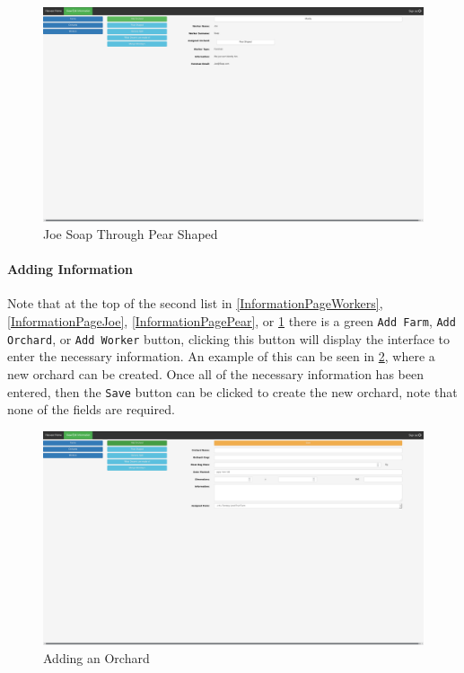 \documentclass[11pt]{article}
\begin{document}
\begin{figure}
 \centering
 \includegraphics[width=12cm, keepaspectratio]{Images/Information-Joe-Pear.png}
 \caption{Joe Soap Through Pear Shaped}
 \label{InformationPageJoePear}
\end{figure}

\paragraph{Adding Information}Note that at the top of the second list in \ref{InformationPageWorkers}, \ref{InformationPageJoe}, \ref{InformationPagePear}, or \ref{InformationPageJoePear} there is a green \texttt{Add Farm}, \texttt{Add Orchard}, or \texttt{Add Worker} button, clicking this button will display the interface to enter the necessary information. An example of this can be seen in \ref{InformationAddOrchard}, where a new orchard can be created. Once all of the necessary information has been entered, then the \texttt{Save} button can be clicked to create the new orchard, note that none of the fields are required.

\begin{figure}
 \centering
 \includegraphics[width=12cm, keepaspectratio]{Images/Information-AddOrchard.png}
 \caption{Adding an Orchard}
 \label{InformationAddOrchard}
\end{figure}
\end{document}
